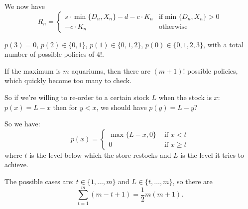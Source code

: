 \begin{solution}
\begin{slide}
\begin{parts}
	\item We now have 
	\[
	R_n = \begin{cases}
		s\cdot \min\{D_n,X_n\} - d - c \cdot K_n & \text{if} \min\{D_n,X_n\}>0 \\
		- c \cdot K_n & \text{otherwise}
 	\end{cases}
	\]

	\item $p(3) = 0$, $p(2)\in\{0,1\}$, $p(1)\in\{0,1,2\}$, $p(0)\in\{0,1,2,3\}$, with a total number of possible policies of $4!$.

	\item If the maximum is $m$ aquariums, then there are $(m+1)!$ possible policies, which quickly become too many to check.

	\item So if we're willing to re-order to a certain stock $L$ when  the stock is $x$: $p(x) = L-x$
		then for $y<x$, we should have $p(y)= L-y$?

	\item So we have:
	\[ 
	p(x) = \begin{cases}
			\max\{L-x,0\}	& \text{ if } x < t 	 \\
			0 				& \text{ if } x \geq t 	
		 \end{cases}
	\]
	where $t$ is the level below which the store restocks and $L$ is the level it tries to achieve.

	The possible cases are: $t \in \{1, \ldots, m\}$ and $L \in \{t, \ldots, m\}$, so there are
	\[\sum_{t=1}^m (m-t+1) =\frac12 m(m+1).
	\]
\end{parts}
\end{slide}	
\end{solution}


